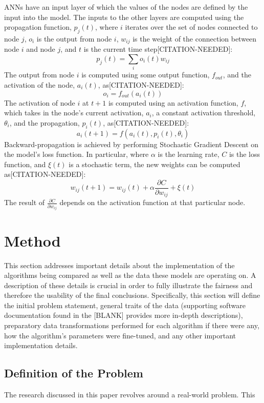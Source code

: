 \documentclass[titlepage]{article}
\begin{document}
ANNs have an input layer of which the values of the nodes are defined by the input into the model. The inputs to the other layers are computed using the propagation function, $p_j(t)$, where $i$ iterates over the set of nodes connected to node $j$, $o_i$ is the output from node $i$, $w_{ij}$ is the weight of the connection between node $i$ and node $j$, and $t$ is the current time step[CITATION-NEEDED]:
$$p_j(t) = \sum\limits_i o_i(t)w_{ij}$$
The output from node $i$ is computed using some output function, $f_{out}$, and the activation of the node, $a_i(t)$, as[CITATION-NEEDED]:
$$o_i = f_{out}(a_i(t))$$
The activation of node $i$ at $t+1$ is computed using an activation function, $f$, which takes in the node's current activation, $a_i$, a constant activation threshold, $\theta_i$, and the propagation, $p_i(t)$, as[CITATION-NEEDED]:
$$a_i(t+1) = f(a_i(t), p_i(t), \theta_i)$$
Backward-propagation is achieved by performing Stochastic Gradient Descent on the model's loss function. In particular, where $\alpha$ is the learning rate, $C$ is the loss function, and $\xi(t)$ is a stochastic term, the new weights can be computed as[CITATION-NEEDED]:
$$w_{ij}(t+1) = w_{ij}(t) + \alpha\frac{\partial C}{\partial w_{ij}} + \xi(t)$$
The result of $\frac{\partial C}{\partial w_{ij}}$ depends on the activation function at that particular node.



\section{Method}
This section addresses important details about the implementation of the algorithms being compared as well as the data these models are operating on. A description of these details is crucial in order to fully illustrate the fairness and therefore the usability of the final conclusions. Specifically, this section will define the initial problem statement, general traits of the data (supporting software documentation found in the [BLANK] provides more in-depth descriptions), preparatory data transformations performed for each algorithm if there were any, how the algorithm's parameters were fine-tuned, and any other important implementation details.

\subsection{Definition of the Problem}
The research discussed in this paper revolves around a real-world problem. This 
\end{document}
